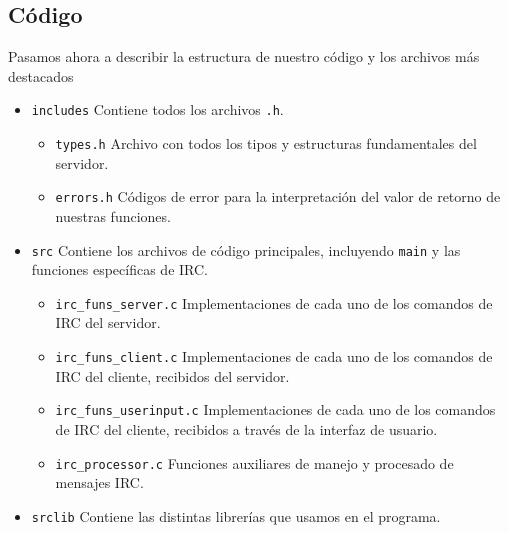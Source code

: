 \documentclass{article}
\begin{document}
\subsection{Código}

Pasamos ahora a describir la estructura de nuestro código y los archivos más destacados

\begin{itemize}
\item \texttt{includes} Contiene todos los archivos \texttt{.h}.
\begin{itemize}
\item \texttt{types.h} Archivo con todos los tipos y estructuras fundamentales del servidor.
\item \texttt{errors.h} Códigos de error para la interpretación del valor de retorno de nuestras funciones.
\end{itemize}
\item \texttt{src} Contiene los archivos de código principales, incluyendo \texttt{main} y las funciones específicas de IRC.
\begin{itemize}
\item \texttt{irc\_funs\_server.c} Implementaciones de cada uno de los comandos de IRC del servidor.
\item \texttt{irc\_funs\_client.c} Implementaciones de cada uno de los comandos de IRC del cliente, recibidos del servidor.
\item \texttt{irc\_funs\_userinput.c} Implementaciones de cada uno de los comandos de IRC del cliente, recibidos a través de la interfaz de usuario.
\item \texttt{irc\_processor.c} Funciones auxiliares de manejo y procesado de mensajes IRC.
\end{itemize}
\item \texttt{srclib} Contiene las distintas librerías que usamos en el programa.


\end{itemize}
\end{document}
